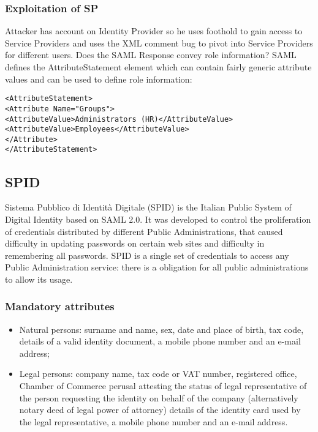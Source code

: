 \documentclass[a4paper, 10pt, titlepage]{article}
\begin{document}
\subsubsection{Exploitation of SP}
Attacker has account on Identity Provider so he uses foothold to gain access to Service Providers and uses the XML comment bug to pivot into Service Providers for different users. Does the SAML Response convey role information? SAML defines the AttributeStatement element which can contain fairly generic attribute values and can be used to define role information:
\begin{lstlisting}
<AttributeStatement>
<Attribute Name="Groups">
<AttributeValue>Administrators (HR)</AttributeValue>
<AttributeValue>Employees</AttributeValue>
</Attribute>
</AttributeStatement>
\end{lstlisting}

\subsection{SPID}
Sistema Pubblico di Identità Digitale (SPID) is the Italian Public System of Digital Identity based on SAML 2.0. It was developed to control the proliferation of credentials distributed by different Public Administrations, that caused difficulty in updating passwords on certain web sites and difficulty in remembering all passwords.
SPID is a single set of credentials to access any Public Administration service: there is a obligation for all public administrations to allow its usage.

\subsubsection{Mandatory attributes}
\begin{itemize}
\item Natural persons: surname and name, sex, date and place of birth, tax code, details of a valid identity document, a mobile phone number and an e-mail address;
\item Legal persons: company name, tax code or VAT number, registered office, Chamber of Commerce perusal attesting the status of legal representative of the person requesting the identity on behalf of the company (alternatively notary deed of legal power of attorney) details of the identity card used by the legal representative, a mobile phone number and an e-mail address.
\end{itemize}
\end{document}
